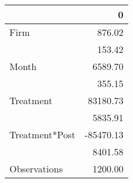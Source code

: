 \begin{tabular}{lr}
\toprule
{} &         0 \\
\midrule
Firm           &    876.02 \\
               &    153.42 \\
Month          &   6589.70 \\
               &    355.15 \\
Treatment      &  83180.73 \\
               &   5835.91 \\
Treatment*Post & -85470.13 \\
               &   8401.58 \\
Observations   &   1200.00 \\
\bottomrule
\end{tabular}
